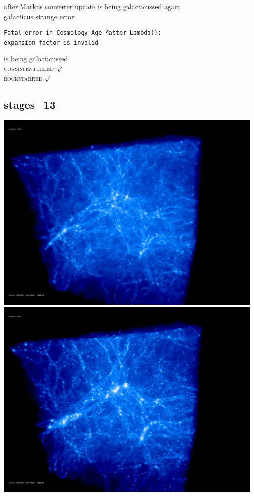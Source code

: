 after Markus converter update 
is being galacticussed again \\
galacticus strange error: 
\begin{verbatim}
Fatal error in Cosmology_Age_Matter_Lambda():
expansion factor is invalid
\end{verbatim}
is being galacticussed \\
\textsc{consistenttreed} $\surd$ \\ 
\textsc{rockstarred} $\surd$

% 
%
%
%
%
%
%
%

\newpage
\subsection{stages\_13}

\includegraphics[scale=0.1]{r256/stages_13/50.jpg} 
\includegraphics[scale=0.1]{r256/stages_13/100.jpg}  \\

